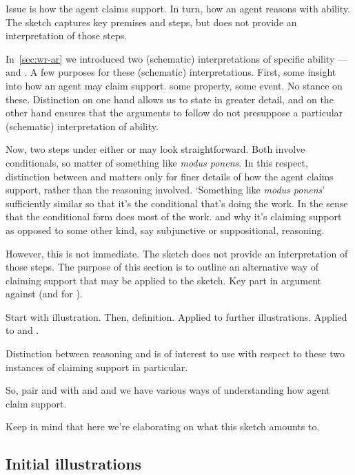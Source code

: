 \begin{note}
  Issue is how the agent claims support.
  In turn, how an agent reasons with ability.
  The sketch captures key premises and steps, but does not provide an interpretation of those steps.

  In~\autoref{sec:wr-ar} we introduced two (schematic) interpretations of specific ability --- \AR{} and \WR{}.
  A few purposes for these (schematic) interpretations.
  First, some insight into how an agent may claim support.
  \AR{} some property, \WR{} some event.
  No stance on these.
  Distinction on one hand allows us to state in greater detail, and on the other hand ensures that the arguments to follow do not presuppose a particular (schematic) interpretation of ability.

  Now, two steps under either \AR{} or \WR{} may look straightforward.
  Both involve conditionals, so matter of something like \emph{modus ponens}.
  In this respect, distinction between \AR{} and \WR{} matters only for finer details of how the agent claims support, rather than the reasoning involved.
  `Something like \emph{modus ponens}' sufficiently similar so that it's the conditional that's doing the work.
  In the sense that the conditional form does most of the work.
  \AR{} and \WR{} why it's claiming support as opposed to some other kind, say subjunctive or suppositional, reasoning.

  However, this is not immediate.
  The sketch does not provide an interpretation of those steps.
  The purpose of this section is to outline an alternative way of claiming support that may be applied to the sketch.
  Key part in argument against \ESU{} (and for \EAS{}).

  Start with illustration.
  Then, definition.
  Applied to further illustrations.
  Applied to \AR{} and \WR{}.


  Distinction between reasoning \adA{} and \adB{} is of interest to use with respect to these two instances of claiming support in particular.

  So, pair \AR{} and \WR{} with \adA{} and \adB{} and we have various ways of understanding how agent claim support.

  Keep in mind that here we're elaborating on what this sketch amounts to.
\end{note}

\subsection{Initial illustrations}

